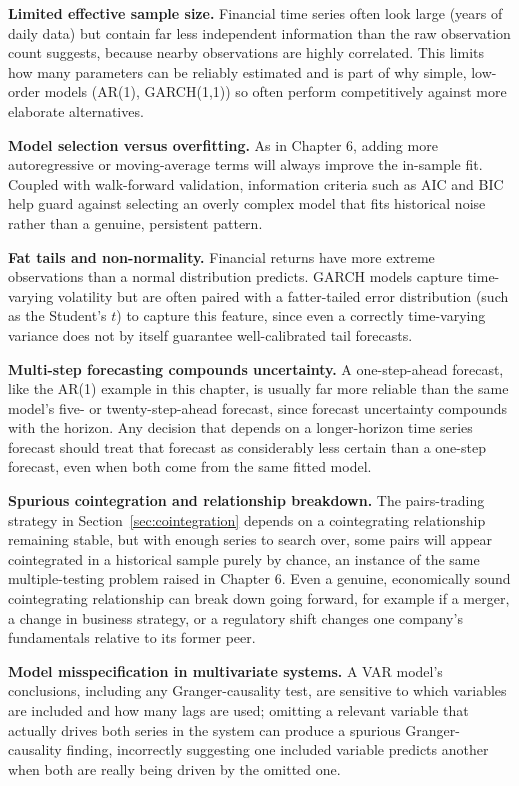 \documentclass[../ai_in_finance]{subfiles}
\begin{document}
\textbf{Limited effective sample size.} Financial time series often look large (years of daily data) but contain far less independent information than the raw observation count suggests, because nearby observations are highly correlated. This limits how many parameters can be reliably estimated and is part of why simple, low-order models (AR(1), GARCH(1,1)) so often perform competitively against more elaborate alternatives.

\textbf{Model selection versus overfitting.} As in Chapter 6, adding more autoregressive or moving-average terms will always improve the in-sample fit. Coupled with walk-forward validation, information criteria such as AIC and BIC help guard against selecting an overly complex model that fits historical noise rather than a genuine, persistent pattern.

\textbf{Fat tails and non-normality.} Financial returns have more extreme observations than a normal distribution predicts. GARCH models capture time-varying volatility but are often paired with a fatter-tailed error distribution (such as the Student's $t$) to capture this feature, since even a correctly time-varying variance does not by itself guarantee well-calibrated tail forecasts.

\textbf{Multi-step forecasting compounds uncertainty.} A one-step-ahead forecast, like the AR(1) example in this chapter, is usually far more reliable than the same model's five- or twenty-step-ahead forecast, since forecast uncertainty compounds with the horizon. Any decision that depends on a longer-horizon time series forecast should treat that forecast as considerably less certain than a one-step forecast, even when both come from the same fitted model.

\textbf{Spurious cointegration and relationship breakdown.} The pairs-trading strategy in Section~\ref{sec:cointegration} depends on a cointegrating relationship remaining stable, but with enough series to search over, some pairs will appear cointegrated in a historical sample purely by chance, an instance of the same multiple-testing problem raised in Chapter 6. Even a genuine, economically sound cointegrating relationship can break down going forward, for example if a merger, a change in business strategy, or a regulatory shift changes one company's fundamentals relative to its former peer.

\textbf{Model misspecification in multivariate systems.} A VAR model's conclusions, including any Granger-causality test, are sensitive to which variables are included and how many lags are used; omitting a relevant variable that actually drives both series in the system can produce a spurious Granger-causality finding, incorrectly suggesting one included variable predicts another when both are really being driven by the omitted one.
\end{document}
